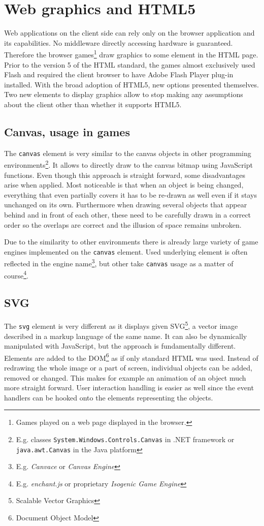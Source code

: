 \documentclass[11pt,oneside, final]{fithesis2}
\begin{document}
\section{Web graphics and HTML5}
Web applications on the client side can rely only on the browser application and its capabilities. No middleware directly accessing hardware is guaranteed. Therefore the browser games\footnote{Games played on a web page displayed in the browser.} draw graphics to some element in the HTML page. Prior to the version 5 of the HTML standard, the games almost exclusively used Flash and required the client browser to have Adobe Flash Player plug-in installed\cite{flashplayer}. With the broad adoption of HTML5, new options presented themselves. Two new elements to display graphics allow to stop making any assumptions about the client other than whether it supports HTML5.

\subsection{Canvas, usage in games}
The \texttt{canvas} element is very similar to the canvas objects in other programming environments\footnote{E.g. classes \texttt{System.Windows.Controls.Canvas} in .NET framework\cite{net_canvas} or \texttt{java.awt.Canvas} in the Java platform\cite{java_canvas}}. It allows to directly draw to the canvas bitmap using JavaScript functions. Even though this approach is straight forward, some disadvantages arise when applied. Most noticeable is that when an object is being changed, everything that even partially covers it has to be re-drawn as well even if it stays unchanged on its own. Furthermore when drawing several objects that appear behind and in front of each other, these need to be carefully drawn in a correct order so the overlaps are correct and the illusion of space remains unbroken.

Due to the similarity to other environments there is already large variety of game engines implemented on the \texttt{canvas} element. Used underlying element is often reflected in the engine name\footnote{E.g. \emph{Canvace}\cite{canvace} or \emph{Canvas Engine}\cite{canvasengine}}, but other take \texttt{canvas} usage as a matter of course\footnote{E.g. \emph{enchant.js}\cite{enchantjs} or proprietary \emph{Isogenic Game Engine}\cite{isogenic}}.

\subsection{SVG}
The \texttt{svg} element is very different as it displays given SVG\footnote{Scalable Vector Graphics}, a vector image described in a markup language of the same name. It can also be dynamically manipulated with JavaScript, but the approach is fundamentally different. Elements are added to the DOM\footnote{Document Object Model} as if only standard HTML was used. Instead of redrawing the whole image or a part of screen, individual objects can be added, removed or changed. This makes for example an animation of an object much more straight forward. User interaction handling is easier as well since the event handlers can be hooked onto the elements representing the objects.
\end{document}
